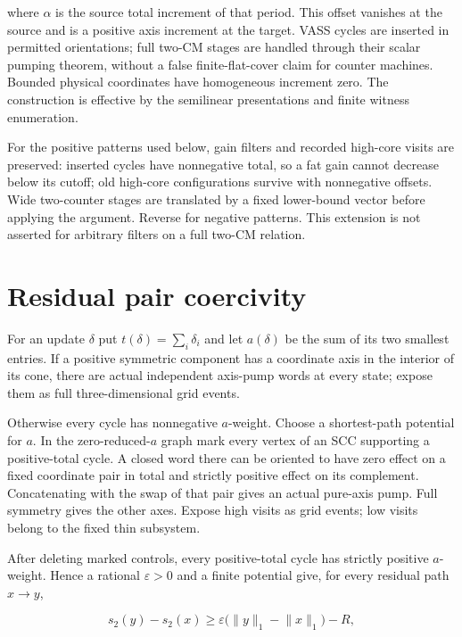 \documentclass[11pt,a4paper]{article}
\theoremstyle{remark}
\newcommand{\tot}[1]{\lVert #1\rVert_1}
\begin{document}
\begin{enumerate}[label=\textup{(\alph*)},leftmargin=*]
where \(\alpha\) is the source total increment of that period. This offset vanishes at the source and is a positive axis increment at the target. VASS cycles are inserted in permitted orientations; full two-CM stages are handled through their scalar pumping theorem, without a false finite-flat-cover claim for counter machines. Bounded physical coordinates have homogeneous increment zero. The construction is effective by the semilinear presentations and finite witness enumeration.

For the positive patterns used below, gain filters and recorded high-core visits are preserved: inserted cycles have nonnegative total, so a fat gain cannot decrease below its cutoff; old high-core configurations survive with nonnegative offsets. Wide two-counter stages are translated by a fixed lower-bound vector before applying the argument. Reverse for negative patterns. This extension is not asserted for arbitrary filters on a full two-CM relation.

\end{enumerate}

\section{Residual pair coercivity}\label{sec:pair}

For an update \(\delta\) put \(t(\delta)=\sum_i\delta_i\) and let \(a(\delta)\) be the sum of its two smallest entries. If a positive symmetric component has a coordinate axis in the interior of its cone, there are actual independent axis-pump words at every state; expose them as full three-dimensional grid events.

Otherwise every cycle has nonnegative \(a\)-weight. Choose a shortest-path potential for \(a\). In the zero-reduced-\(a\) graph mark every vertex of an SCC supporting a positive-total cycle. A closed word there can be oriented to have zero effect on a fixed coordinate pair in total and strictly positive effect on its complement. Concatenating with the swap of that pair gives an actual pure-axis pump. Full symmetry gives the other axes. Expose high visits as grid events; low visits belong to the fixed thin subsystem.

After deleting marked controls, every positive-total cycle has strictly positive \(a\)-weight. Hence a rational \(\varepsilon>0\) and a finite potential give, for every residual path \(x\to y\),

\begin{equation}
s_2(y)-s_2(x)\geq \varepsilon\bigl(\tot y-\tot x\bigr)-R, \label{eq:pair}
\end{equation}
\end{document}
